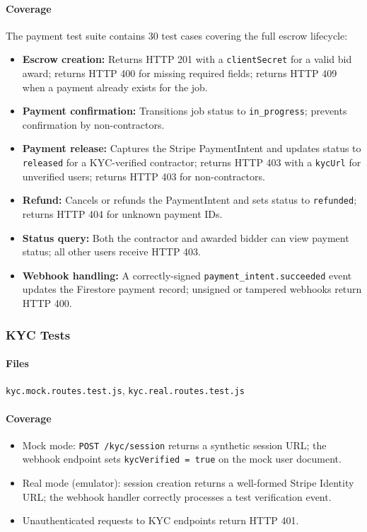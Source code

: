 \documentclass[11pt]{article}
\begin{document}
\paragraph{Coverage}
The payment test suite contains 30 test cases covering the full escrow lifecycle:
\begin{itemize}[leftmargin=1.4em]
  \item \textbf{Escrow creation:} Returns HTTP 201 with a \texttt{clientSecret} for a valid bid award; returns HTTP 400 for missing required fields; returns HTTP 409 when a payment already exists for the job.
  \item \textbf{Payment confirmation:} Transitions job status to \texttt{in\_progress}; prevents confirmation by non-contractors.
  \item \textbf{Payment release:} Captures the Stripe PaymentIntent and updates status to \texttt{released} for a KYC-verified contractor; returns HTTP 403 with a \texttt{kycUrl} for unverified users; returns HTTP 403 for non-contractors.
  \item \textbf{Refund:} Cancels or refunds the PaymentIntent and sets status to \texttt{refunded}; returns HTTP 404 for unknown payment IDs.
  \item \textbf{Status query:} Both the contractor and awarded bidder can view payment status; all other users receive HTTP 403.
  \item \textbf{Webhook handling:} A correctly-signed \texttt{payment\_intent.succeeded} event updates the Firestore payment record; unsigned or tampered webhooks return HTTP 400.
\end{itemize}

\subsubsection{KYC Tests}

\paragraph{Files}
\texttt{kyc.mock.routes.test.js}, \texttt{kyc.real.routes.test.js}

\paragraph{Coverage}
\begin{itemize}[leftmargin=1.4em]
  \item Mock mode: \texttt{POST /kyc/session} returns a synthetic session URL; the webhook endpoint sets \texttt{kycVerified = true} on the mock user document.
  \item Real mode (emulator): session creation returns a well-formed Stripe Identity URL; the webhook handler correctly processes a test verification event.
  \item Unauthenticated requests to KYC endpoints return HTTP 401.
\end{itemize}
\end{document}
